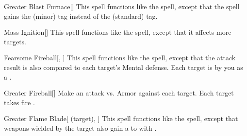 \lowercase{\hypertarget{spell:Greater Blast Furnace}{}}\label{spell:Greater Blast Furnace}
\begin{freeability}[\nth{4}]{\hypertarget{spell:Greater Blast Furnace}{Greater Blast Furnace}}[]
This spell functions like the  spell, except that the spell gains the  (minor) tag instead of the  (standard) tag.
\end{freeability}
\vspace{0.25em}



\lowercase{\hypertarget{spell:Mass Ignition}{}}\label{spell:Mass Ignition}
\begin{freeability}[\nth{4}]{\hypertarget{spell:Mass Ignition}{Mass Ignition}}[]
This spell functions like the  spell, except that it affects more targets.
\end{freeability}
\vspace{0.25em}



\lowercase{\hypertarget{spell:Fearsome Fireball}{}}\label{spell:Fearsome Fireball}
\begin{freeability}[\nth{5}]{\hypertarget{spell:Fearsome Fireball}{Fearsome Fireball}}[, ]
This spell functions like the  spell, except that the attack result is also compared to each target's Mental defense.
\hit Each target is  by you as a .
\end{freeability}
\vspace{0.25em}



\lowercase{\hypertarget{spell:Greater Fireball}{}}\label{spell:Greater Fireball}
\begin{freeability}[\nth{5}]{\hypertarget{spell:Greater Fireball}{Greater Fireball}}[]
Make an attack vs. Armor against each target.
\hit Each target takes fire .
\end{freeability}
\vspace{0.25em}



\lowercase{\hypertarget{spell:Greater Flame Blade}{}}\label{spell:Greater Flame Blade}
\begin{attuneability}[\nth{5}]{\hypertarget{spell:Greater Flame Blade}{Greater Flame Blade}}[ (target), ]
This spell functions like the  spell, except that weapons wielded by the target also gain a   to  with .
\end{attuneability}
\vspace{0.25em}



